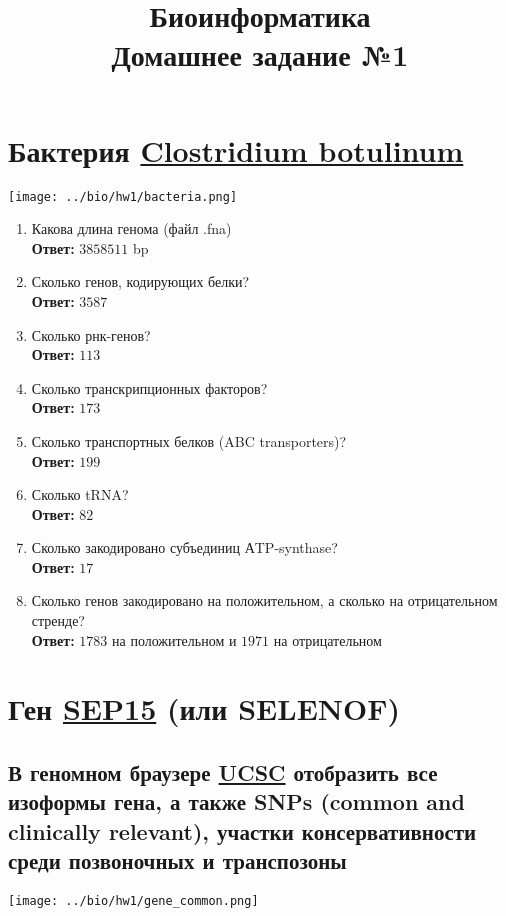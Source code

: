 \documentclass{article}
\title{Биоинформатика \\ Домашнее задание №1}
\begin{document}
  \maketitle

  \section{Бактерия \href{https://en.wikipedia.org/wiki/Clostridium_botulinum}{Clostridium botulinum}}
  \texttt{[image: ../bio/hw1/bacteria.png]}

  \begin{enumerate}
    \item Какова длина генома (файл .fna) \\
      \textbf{Ответ:} $3858511$ bp
    \item Сколько генов, кодирующих белки? \\
      \textbf{Ответ:} $3587$
    \item Сколько рнк-генов? \\
      \textbf{Ответ:} $113$
    \item Сколько транскрипционных факторов? \\
      \textbf{Ответ:} $173$
    \item Сколько транспортных белков (ABC transporters)? \\
      \textbf{Ответ:} $199$
    \item Сколько tRNA? \\
      \textbf{Ответ:} $82$
    \item Сколько закодировано субъединиц АTP-synthase? \\
      \textbf{Ответ:} $17$
    \item Сколько генов закодировано на положительном, а сколько на отрицательном стренде? \\
      \textbf{Ответ:} $1783$ на положительном и $1971$ на отрицательном
  \end{enumerate}

  \section{Ген \href{https://en.wikipedia.org/wiki/SEP15}{SEP15} (или SELENOF)}
  \subsection{В геномном браузере \href{https://genome-euro.ucsc.edu/cgi-bin/hgTracks?db=hg38&position=chr1\%3A86862445\%2D86914365}{UCSC} отобразить все изоформы гена, а также SNPs (common and clinically relevant), участки консервативности среди позвоночных и транспозоны}
  \texttt{[image: ../bio/hw1/gene\_common.png]}
\end{document}
